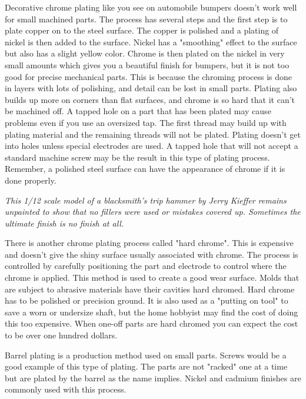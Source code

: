 
Decorative chrome plating like you see on automobile bumpers doesn't work well
for small machined parts. The process has several steps and the first step is to
plate copper on to the steel surface. The copper is polished and a plating of
nickel is then added to the surface. Nickel has a "smoothing" effect to the
surface but also has a slight yellow color. Chrome is then plated on the nickel
in very small amounts which gives you a beautiful finish for bumpers, but it is
not too good for precise mechanical parts. This is because the chroming process
is done in layers with lots of polishing, and detail can be lost in small parts.
Plating also builds up more on corners than flat surfaces, and chrome is so hard
that it can't be machined off. A tapped hole on a part that has been plated may
cause problems even if you use an oversized tap. The first thread may build up
with plating material and the remaining threads will not be plated. Plating
doesn't get into holes unless special electrodes are used. A tapped hole that
will not accept a standard machine screw may be the result in this type of
plating process. Remember, a polished steel surface can have the appearance of
chrome if it is done properly.

\bigskip
\textit{This 1/12 scale model of a blacksmith's trip hammer by Jerry Kieffer
remains unpainted to show that no fillers were used or mistakes covered up.
Sometimes the ultimate finish is no finish at all.}
\bigskip


There is another chrome plating process called "hard chrome". This is expensive
and doesn't give the shiny surface usually associated with chrome. The process
is controlled by carefully positioning the part and electrode to control where
the chrome is applied. This method is used to create a good wear surface. Molds
that are subject to abrasive materials have their cavities hard chromed. Hard
chrome has to be polished or precision ground. It is also used as a "putting on
tool" to save a worn or undersize shaft, but the home hobbyist may find the cost
of doing this too expensive. When one-off parts are hard chromed you can expect
the cost to be over one hundred dollars.


Barrel plating is a production method used on small parts. Screws would be a
good example of this type of plating. The parts are not "racked" one at a time
but are plated by the barrel as the name implies. Nickel and cadmium finishes
are commonly used with this process.

